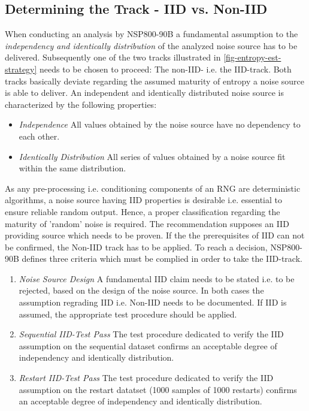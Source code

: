 \subsection{Determining the Track - IID vs. Non-IID}\label{sub:iid-noniid-track}
When conducting an analysis by NSP800-90B a fundamental assumption to the \textit{independency and identically distribution} of the analyzed noise source has to be delivered. Subsequently one of the two tracks illustrated in \ref{fig-entropy-est-strategy} needs to be chosen to proceed: The non-IID- i.e. the IID-track. Both tracks basically deviate regarding the assumed maturity of entropy a noise source is able to deliver. An independent and identically distributed noise source is characterized by the following properties: 
\begin{itemize}
	\item \textit{Independence} All values obtained by the noise source have no dependency to each other.
		\item \textit{Identically Distribution} All series of values obtained by a noise source fit within the same distribution.
\end{itemize}
As any pre-processing i.e. conditioning components of an RNG are deterministic algorithms, a noise source having IID properties is desirable i.e. essential to ensure reliable random output. Hence, a proper classification regarding the maturity of 'random' noise is required. The recommendation supposes an IID providing source which needs to be proven. If the the prerequisites of IID can not be confirmed, the Non-IID track has to be applied. To reach a decision, NSP800-90B defines three criteria which must be complied in order to take the IID-track.

\begin{enumerate}
	\item \textit{Noise Source Design} A fundamental IID claim needs to be stated i.e. to be rejected, based on the design of the noise source. In both cases the assumption regrading IID i.e. Non-IID needs to be documented. If IID is assumed, the appropriate test procedure should be applied.
	\item \textit{Sequential IID-Test Pass} The test procedure dedicated to verify the IID assumption on the sequential dataset confirms an acceptable degree of independency and identically distribution.
	\item \textit{Restart IID-Test Pass} The test procedure dedicated to verify the IID assumption on the restart datatset (1000 samples of 1000 restarts) confirms an acceptable degree of independency and identically distribution.
\end{enumerate}

